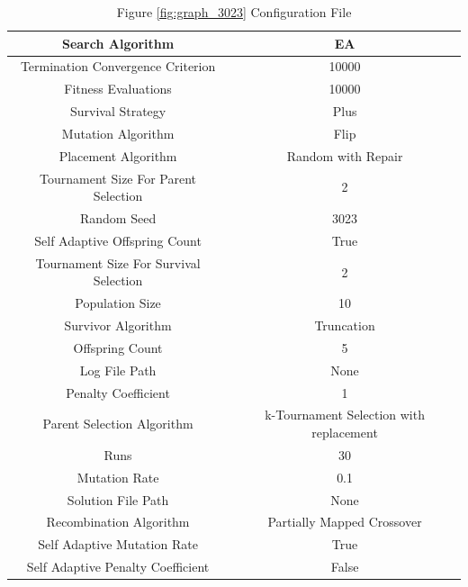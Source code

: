 \documentclass{standalone}
\begin{document}
\begin{table}[!htb]
	\centering
	\caption{Figure \ref{fig:graph_3023} Configuration File}
	\label{tab:graph_3023}
	\begin{tabular}{| c | c |}
		\hline
		Search Algorithm		& EA		 \\
		\hline
		Termination Convergence Criterion		& 10000		 \\
		\hline
		Fitness Evaluations		& 10000		 \\
		\hline
		Survival Strategy		& Plus		 \\
		\hline
		Mutation Algorithm		& Flip		 \\
		\hline
		Placement Algorithm		& Random with Repair		 \\
		\hline
		Tournament Size For Parent Selection		& 2		 \\
		\hline
		Random Seed		& 3023		 \\
		\hline
		Self Adaptive Offspring Count		& True		 \\
		\hline
		Tournament Size For Survival Selection		& 2		 \\
		\hline
		Population Size		& 10		 \\
		\hline
		Survivor Algorithm		& Truncation		 \\
		\hline
		Offspring Count		& 5		 \\
		\hline
		Log File Path		& None		 \\
		\hline
		Penalty Coefficient		& 1		 \\
		\hline
		Parent Selection Algorithm		& k-Tournament Selection with replacement		 \\
		\hline
		Runs		& 30		 \\
		\hline
		Mutation Rate		& 0.1		 \\
		\hline
		Solution File Path		& None		 \\
		\hline
		Recombination Algorithm		& Partially Mapped Crossover		 \\
		\hline
		Self Adaptive Mutation Rate		& True		 \\
		\hline
		Self Adaptive Penalty Coefficient		& False		 \\
		\hline
	\end{tabular}
\end{table}
\end{document}
